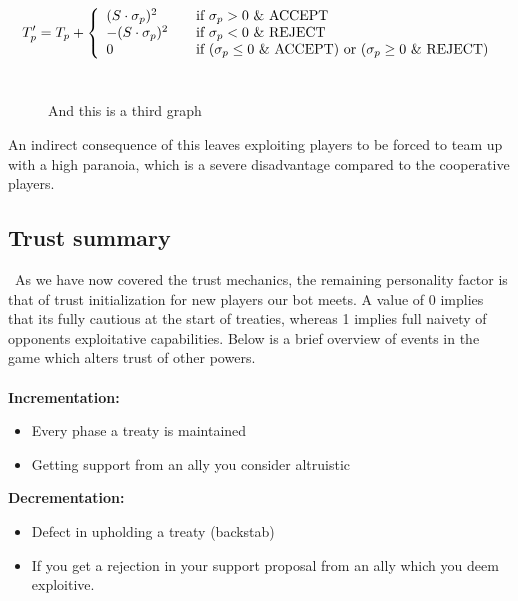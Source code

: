 \documentclass[a4paper]{article} %
\begin{document}
  \[ T'_p = T_p + \left\{ 
  \begin{array}{l l}
    (S \cdot \sigma_p)^2 & \quad \text{if $\sigma_p > 0$ \& ACCEPT}\\
    -(S \cdot \sigma_p)^2 & \quad \text{if $\sigma_p < 0$ \& REJECT}\\
    \text{0} & \quad \text{if ($\sigma_p \le 0$ \& ACCEPT) or ($\sigma_p \geq 0$ \& REJECT)}
    
  \end{array} \right.\]
  \\
\begin{figure}[H]
\centering
{}
\caption{And this is a third graph}
\label{fig:graph3}
\end{figure}

An indirect consequence of this leaves exploiting players to be forced to team up with a high paranoia, which is a severe disadvantage compared to the cooperative players.

\subsection{Trust summary}
\
As we have now covered the trust mechanics, the remaining personality factor is that of trust initialization for new players our bot meets. A value of 0 implies that its fully cautious at the start of treaties, whereas 1 implies full naivety of opponents exploitative capabilities. Below is a brief overview of events in the game which alters trust of other powers.\\
\
\\
\textbf{Incrementation:}
\begin{itemize}
\item {Every phase a treaty is maintained}
\item {Getting support from an ally you consider altruistic}
\end{itemize}
\textbf{Decrementation:}
\begin{itemize}
\item{Defect in upholding a treaty (backstab)}
\item{If you get a rejection in your support proposal from an ally which you deem exploitive.}
\end{itemize}
\end{document}
